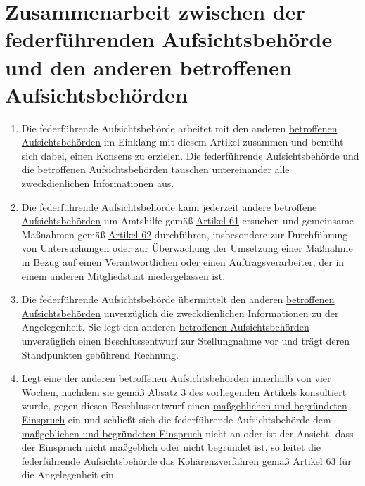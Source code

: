 \chapter{Zusammenarbeit zwischen der federführenden Aufsichtsbehörde und den anderen betroffenen Aufsichtsbehörden}
\label{ch:60}


\begin{enumerate}

  \item Die federführende Aufsichtsbehörde arbeitet mit den anderen \hyperref[itm:04-22]{betroffenen Aufsichtsbehörden} im Einklang mit diesem
   Artikel zusammen und bemüht sich dabei, einen Konsens zu erzielen. Die federführende Aufsichtsbehörde und die
   \hyperref[itm:04-22]{betroffenen Aufsichtsbehörden} tauschen untereinander alle zweckdienlichen Informationen aus.
  \label{itm:60-1}

  \item Die federführende Aufsichtsbehörde kann jederzeit andere \hyperref[itm:04-22]{betroffene Aufsichtsbehörden} um Amtshilfe gemäß
  \hyperref[ch:61]{Artikel 61} ersuchen und gemeinsame Maßnahmen gemäß \hyperref[ch:62]{Artikel 62} durchführen,
   insbesondere zur Durchführung von Untersuchungen oder zur Überwachung der Umsetzung einer Maßnahme in Bezug auf
   einen Verantwortlichen oder einen Auftragsverarbeiter, der in einem anderen Mitgliedstaat niedergelassen ist.
  \label{itm:60-2}

  \item Die federführende Aufsichtsbehörde übermittelt den anderen \hyperref[itm:04-22]{betroffenen Aufsichtsbehörden} unverzüglich die
   zweckdienlichen Informationen zu der Angelegenheit. Sie legt den anderen \hyperref[itm:04-22]{betroffenen Aufsichtsbehörden} unverzüglich
   einen Beschlussentwurf zur Stellungnahme vor und trägt deren Standpunkten gebührend Rechnung.
  \label{itm:60-3}

  \item Legt eine der anderen \hyperref[itm:04-22]{betroffenen Aufsichtsbehörden} innerhalb von vier Wochen, nachdem sie gemäß \hyperref
   [itm:60-3]{Absatz 3 des vorliegenden Artikels} konsultiert wurde, gegen diesen Beschlussentwurf einen \hyperref[itm:04-27]{maßgeblichen
   und begründeten Einspruch} ein und schließt sich die federführende Aufsichtsbehörde dem \hyperref[itm:04-27]{maßgeblichen und begründeten
   Einspruch} nicht an oder ist der Ansicht, dass der Einspruch nicht maßgeblich oder nicht begründet ist, so leitet die
   federführende Aufsichtsbehörde das Kohärenzverfahren gemäß \hyperref[ch:63]{Artikel 63} für die Angelegenheit ein.
  \label{itm:60-4}


\end{enumerate}

